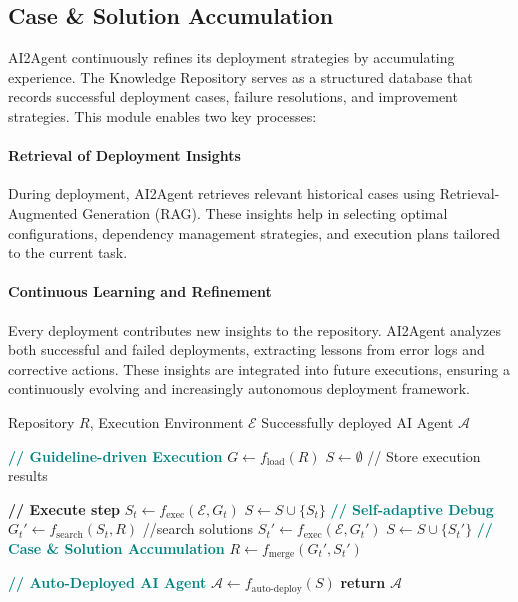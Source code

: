 \subsection{Case \& Solution Accumulation}
AI2Agent continuously refines its deployment strategies by accumulating experience. The Knowledge Repository serves as a structured database that records successful deployment cases, failure resolutions, and improvement strategies. This module enables two key processes:

\paragraph{Retrieval of Deployment Insights} During deployment, AI2Agent retrieves relevant historical cases using Retrieval-Augmented Generation (RAG). These insights help in selecting optimal configurations, dependency management strategies, and execution plans tailored to the current task.

\paragraph{Continuous Learning and Refinement} Every deployment contributes new insights to the repository. AI2Agent analyzes both successful and failed deployments, extracting lessons from error logs and corrective actions. These insights are integrated into future executions, ensuring a continuously evolving and increasingly autonomous deployment framework.




\begin{algorithm}
\caption{AI2Agent: Automated AI Deployment}
\label{alg:general_deploy}
\begin{algorithmic}[1]

\Require Repository $R$, Execution Environment $\mathcal{E}$ 
\Return Successfully deployed AI Agent $\mathcal{A}$

\State \textbf{\textcolor{teal}{// Guideline-driven Execution}}  
\State ${G} \gets f_{\text{load}}({R})$  
\State $S \gets \emptyset$ // Store execution results

    \State \textbf{// Execute step} 
    \State $S_t \gets f_{\text{exec}}(\mathcal{E}, {G}_t)$  
    \State $S \gets S \cup \{S_t\}$  
   \State \textbf{\textcolor{teal}{// Self-adaptive Debug}}  
         \State ${G}_t' \gets f_{\text{search}}(S_t,R)$   {//search solutions}
         \State $S_t' \gets f_{\text{exec}}(\mathcal{E}, {G}_t')$  
         \State $S \gets S \cup \{S_t'\}$
     \State \textbf{\textcolor{teal}{// Case \& Solution Accumulation}}
     \State ${R} \gets f_{\text{merge}}({G}_t',S_t')$
    \EndWhile 
\EndFor 

\State \textbf{\textcolor{teal}{// Auto-Deployed AI Agent}}  
\State $\mathcal{A} \gets f_{\text{auto-deploy}}(S)$  
\State \textbf{return} $\mathcal{A}$  

\end{algorithmic}
\end{algorithm}


